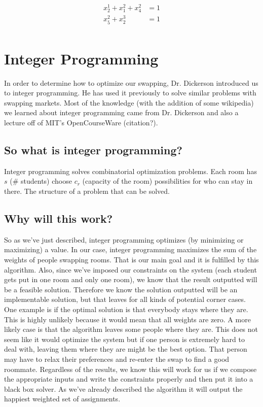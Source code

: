 \documentclass[12pt]{article}
\begin{document}
\begin{align*}
x_2^1+x_1^2+x_4^2&=1\\
x_5^2+x_2^3&=1\\
\end{align*}


\section{Integer Programming}
In order to determine how to optimize our swapping, Dr. Dickerson introduced us to integer programming. He has used it previously to solve similar problems with swapping markets. Most of the knowledge (with the addition of some wikipedia) we learned about integer programming came from Dr. Dickerson and also a lecture off of MIT's OpenCourseWare (citation?).

\subsection{So what is integer programming?}
Integer programming solves combinatorial optimization problems. Each room has $s$ (\# students) choose $c_r$ (capacity of the room) possibilities for who can stay in there. The structure of a problem that can be solved. 

\subsection{Why will this work?}
So as we've just described, integer programming optimizes (by minimizing or maximizing) a value. In our case, integer programming maximizes the sum of the weights of people swapping rooms. That is our main goal and it is fulfilled by this algorithm. Also, since we've imposed our constraints on the system (each student gets put in one room and only one room), we know that the result outputted will be a feasible solution. Therefore we know the solution outputted will be an implementable solution, but that leaves for all kinds of potential corner cases. One example is if the optimal solution is that everybody stays where they are. This is highly unlikely because it would mean that all weights are zero. A more likely case is that the algorithm leaves some people where they are. This does not seem like it would optimize the system but if one person is extremely hard to deal with, leaving them where they are might be the best option. That person may have to relax their preferences and re-enter the swap to find a good roommate. Regardless of the results, we know this will work for us if we compose the appropriate inputs and write the constraints properly and then put it into a black box solver. As we've already described the algorithm it will output the happiest weighted set of assignments.
\end{document}
